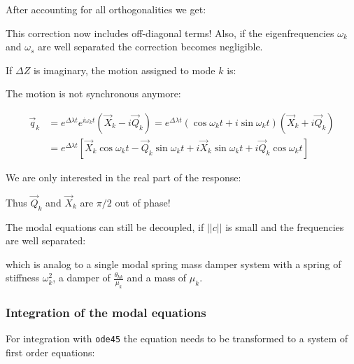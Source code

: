 \documentclass[10pt,a4paper]{scrartcl}
\begin{document}
\begin{multicols*}{2}
After accounting for all orthogonalities we get:


This correction now includes off-diagonal terms! Also, if the eigenfrequencies $\omega_k$ and $\omega_s$ are well separated the correction becomes negligible.

If $\Delta Z$ is imaginary, the motion assigned to mode $k$ is:


The motion is not synchronous anymore:

\begin{align*}
\vec{q}_k&=e^{\Delta\lambda t}e^{i\omega_kt}(\vec{X}_k-i\vec{Q}_k)=e^{\Delta\lambda t}(\cos\omega_k t+i\sin\omega_k t)(\vec{X}_k+i\vec{Q}_k)\\
&=e^{\Delta\lambda t}[\vec{X}_k\cos\omega_k t-\vec{Q}_k\sin\omega_kt+i\vec{X}_k\sin\omega_kt+i\vec{Q}_k\cos\omega_k t]
\end{align*}

We are only interested in the real part of the response:


Thus $\vec{Q}_k$ and $\vec{X}_k$ are $\pi/2$ out of phase!

The modal equations can still be decoupled, if $||c||$ is small and the frequencies are well separated:


which is analog to a single modal spring mass damper system with a spring of stiffness $\omega_k^2$, a damper of $\frac{\theta_{kk}}{\mu_k}$ and a mass of $\mu_k$.

\subsubsection{Integration of the modal equations}

For integration with \verb+ode45+ the equation needs to be transformed to a system of first order equations:


\end{multicols*}
\end{document}
